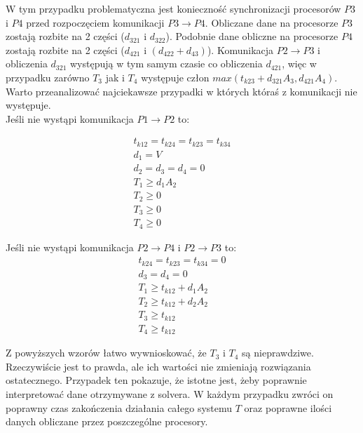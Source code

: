 W tym przypadku problematyczna jest konieczność synchronizacji procesorów $P3$ i $P4$ przed rozpoczęciem komunikacji $P3 \to P4$.
Obliczane dane na procesorze $P3$ zostają rozbite na 2 części ($d_{321}$ i $d_{322}$).
Podobnie dane obliczne na procesorze $P4$ zostają rozbite na 2 części ($d_{421}$ i $(d_{422} + d_{43})$).
Komunikacja $P2 \to P3$ i obliczenia $d_{321}$ występują w tym samym czasie co obliczenia $d_{421}$,
więc w przypadku zarówno $T_{3}$ jak i $T_{4}$ występuje człon $max(t_{k23} + d_{321}A_{3}, d_{421}A_{4})$. \\

Warto przeanalizować najciekawsze przypadki w których któraś z komunikacji nie występuje. \\

Jeśli nie wystąpi komunikacja $P1 \to P2$ to:

\begin{equation}
\begin{array}{l}
t_{k12} = t_{k24} = t_{k23} = t_{k34} \\
d_{1} = V \\
d_{2} = d_{3} = d_{4} = 0 \\
T_{1} \geq d_{1}A_{2} \\
T_{2} \geq 0 \\
T_{3} \geq 0 \\
T_{4} \geq 0
\end{array} 
\end{equation}

Jeśli nie wystąpi komunikacja $P2 \to P4$ i $P2 \to P3$ to:
\begin{equation}
\begin{array}{l}
t_{k24} = t_{k23} = t_{k34} = 0 \\
d_{3} = d_{4} = 0 \\
T_{1} \geq t_{k12} + d_{1}A_{2} \\
T_{2} \geq t_{k12} + d_{2}A_{2} \\
T_{3} \geq t_{k12} \\
T_{4} \geq t_{k12}
\end{array}
\end{equation}

Z powyższych wzorów łatwo wywnioskować, że $T_{3}$ i $T_{4}$ są nieprawdziwe. Rzeczywiście jest to prawda, ale ich wartości nie zmieniają rozwiązania ostatecznego.
Przypadek ten pokazuje, że istotne jest, żeby poprawnie interpretować dane otrzymywane z solvera. W każdym przypadku zwróci on poprawny czas zakończenia działania całego systemu $T$
oraz poprawne ilości danych obliczane przez poszczególne procesory. \\

